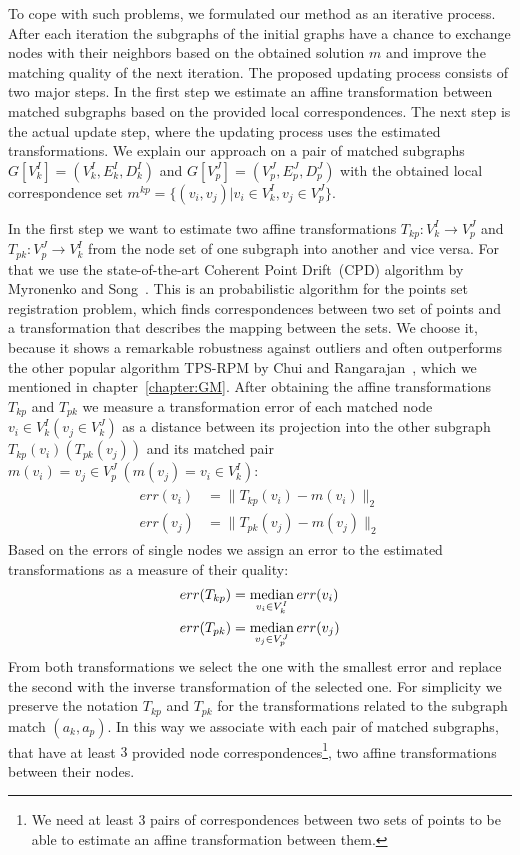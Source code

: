 To cope with such problems, we formulated our method as an iterative process. After each iteration the subgraphs of the initial graphs have a chance to exchange nodes with their neighbors based on the obtained solution $m$ and improve the matching quality of the next iteration. The proposed updating process consists of two major steps. In the first step we estimate an affine transformation between matched subgraphs based on the provided local correspondences. The next step is the actual update step, where the updating process uses the estimated transformations.
We explain our approach on a pair of matched subgraphs $G[V^I_k]=(V^I_k, E^I_k, D^I_k)$ and $G[V^J_p]=(V^J_p, E^J_p, D^J_p)$  with the obtained local correspondence set $m^{kp}=\{(v_i,v_j)|v_i\in V^I_k, v_j\in V^J_p\}$. 

In the first step we want to estimate two affine transformations $T_{kp}:V^I_k\rightarrow V^J_p$ and $T_{pk}:V^J_p\rightarrow V^I_k$ from the node set of one subgraph into another and vice versa. For that we use the state-of-the-art Coherent Point Drift~(CPD) algorithm by Myronenko and Song~\cite{Myronenko2009_CPD}. This is an probabilistic algorithm for the points set registration problem, which finds correspondences between two set of points and a transformation that describes the mapping between the sets. We choose it, because it shows a remarkable robustness against outliers and often outperforms the other popular algorithm TPS-RPM by Chui and Rangarajan~\cite{Chui2003}, which we mentioned in chapter~\ref{chapter:GM}. After obtaining the affine transformations $T_{kp}$ and $T_{pk}$ we measure a transformation error of each matched node $v_i\in V^I_k (v_j\in V^J_k)$ as a distance between its projection into the other subgraph $T_{kp}(v_i) (T_{pk}(v_j))$ and its matched pair $m(v_i) = v_j\in V^J_p\ (m(v_j) = v_i\in V^I_k)$:
\begin{align}\begin{split} \label{eq:err_v}
err(v_i) &= \|T_{kp}(v_i) - m(v_i)\|_{2}\\
err(v_j) &= \|T_{pk}(v_j) - m(v_j)\|_{2}
\end{split}\end{align}
Based on the errors of single nodes we assign an error to the estimated transformations as a measure of their quality:
\begin{equation}\begin{split} \label{eq:err_T}
err(T_{kp}) & = \mathop{\rm median}_{v_i\in V^I_k}err(v_i) \\
err(T_{pk}) & = \mathop{\rm median}_{v_j\in V^J_p}err(v_j)
\end{split}\end{equation}
From both transformations we select the one with the smallest error and replace the second with the inverse transformation of the selected one. For simplicity we preserve the notation $T_{kp}$ and $T_{pk}$ for the transformations related to the subgraph match $(a_k, a_p)$. In this way we associate with each pair of matched subgraphs, that have at least $3$ provided node correspondences\footnote{We need at least $3$ pairs of correspondences between two sets of points to be able to estimate an affine transformation between them.}, two affine transformations between their nodes.

